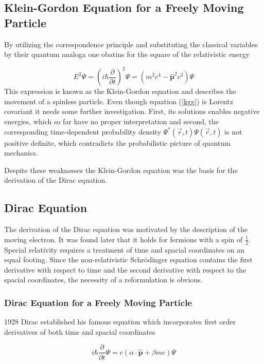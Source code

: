 \subsection{Klein-Gordon Equation for a Freely Moving Particle}
By utilizing the correspondence principle and substituting the classical variables
by their quantum analoga one obatins for the square of the relativistic energy



\begin{equation}\label{kgg}
E^2\Psi = \left(i\hbar \frac\partial{\partial t}\right)^2\Psi = \left(m^2c^4-\hat{\mathbf{p}}^2c^2\right) \Psi
\end{equation}
This expression is known as the Klein-Gordon equation and describes the movement of
a spinless particle.\cite{kellogg97}
Even though equation (\ref{kgg}) is Lorentz covariant it needs some further
investigation. First, its solutions enables negative energies, which so far have
no proper interpretation and second, the corresponding time-dependent probability
density $\Psi^*(\vec{r},t)\Psi(\vec{r},t)$ is not positive definite, which
contradicts the probabilistic picture of quantum mechanics.

Despite these weaknesses the Klein-Gordon equation was the basis for the
derivation of the Dirac equation.


\subsection{Dirac Equation}
The derivation of the Dirac equation was motivated by the description of the
moving electron. It was found later that it holds for fermions with a spin of
$\frac12$.
Special relativity requires a treatment of time and spacial coordinates on an
equal footing. Since the non-relativistic Schrödinger equation contains the first
derivative with respect to time and the second derivative with respect to the spacial
coordinates, the necessity of a reformulation is obvious.


\subsubsection{Dirac Equation for a Freely Moving Particle}\label{freep}
1928 Dirac established his famous equation which incorporates first order
derivatives of both time and spacial coordinates \cite{Dirac28_1}

\begin{equation}\label{diracg}
i\hbar \frac\partial{\partial t} \Psi = c (\alpha\cdot\hat{\mathbf{p}}+\beta mc) \Psi
\end{equation}

